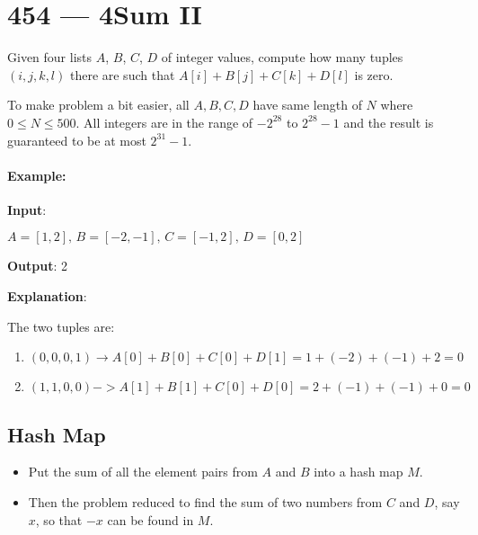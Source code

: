\section{454 --- 4Sum II}
Given four lists $A$, $B$, $C$, $D$ of integer values, compute how many tuples $(i, j, k, l)$ there are such that $A[i] + B[j] + C[k] + D[l]$ is zero.

To make problem a bit easier, all $A, B, C, D$ have same length of $N$ where $0 \leq N \leq 500$. All integers are in the range of $-2^{28}$ to $2^{28} - 1$ and the result is guaranteed to be at most $2^{31} - 1$.

\paragraph{Example:}

\begin{flushleft}
\textbf{Input}:

$A = [ 1, 2],\, B = [-2,-1],\, C = [-1, 2], \,D = [ 0, 2]$

\textbf{Output}: 2

\textbf{Explanation}:

The two tuples are:

\begin{enumerate}
\item $(0, 0, 0, 1) \longrightarrow A[0] + B[0] + C[0] + D[1] = 1 + (-2) + (-1) + 2 = 0$
\item $(1, 1, 0, 0) -> A[1] + B[1] + C[0] + D[0] = 2 + (-1) + (-1) + 0 = 0$
\end{enumerate}
\end{flushleft}

\subsection{Hash Map}

\begin{itemize}
\item Put the sum of all the element pairs from $A$ and $B$ into a hash map $M$.
\item Then the problem reduced to find the sum of two numbers from $C$ and $D$, say $x$, so that $-x$ can be found in $M$.
\end{itemize}

